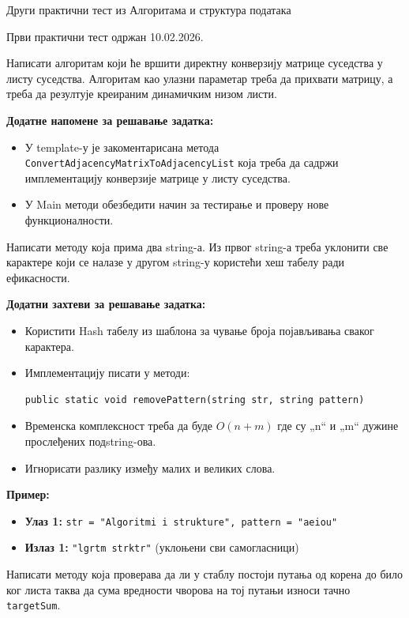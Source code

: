 
Други практични тест из Алгоритама и структура података

Први практични тест одржан 10.02.2026.

Написати алгоритам који ће вршити директну конверзију матрице суседства у листу суседства. Алгоритам као улазни параметар треба да прихвати матрицу, а треба да резултује креираним динамичким низом листи.

\textbf{Додатне напомене за решавање задатка:}
\begin{itemize}
	\item У template-у је закоментарисана метода \texttt{ConvertAdjacencyMatrixToAdjacencyList} која треба да садржи имплементацију конверзије матрице у листу суседства.
	\item У Main методи обезбедити начин за тестирање и проверу нове функционалности.
\end{itemize}

Написати методу која прима два string-а. Из првог string-а треба уклонити све карактере који се налазе у другом string-у користећи хеш табелу ради ефикасности.

\textbf{Додатни захтеви за решавање задатка:}
\begin{itemize}
	\item Користити Hash табелу из шаблона за чување броја појављивања сваког карактера.
	\item Имплементацију писати у методи:
	\begin{Verbatim}[fontsize=\small]
public static void removePattern(string str, string pattern)
	\end{Verbatim}
	\item Временска комплексност треба да буде $O(n + m)$ где су „n“ и „m“ дужине прослеђених подstring-ова.
	\item Игнорисати разлику између малих и великих слова.
\end{itemize}

\textbf{Пример:}
\begin{itemize}
	\item \textbf{Улаз 1:} \texttt{str = "Algoritmi i strukture", pattern = "aeiou"}
	\item \textbf{Излаз 1:} \texttt{"lgrtm  strktr"} (уклоњени сви самогласници)
\end{itemize}

Написати методу која проверава да ли у стаблу постоји путања од корена до било ког листа таква да сума вредности чворова на тој путањи износи тачно \texttt{targetSum}.

